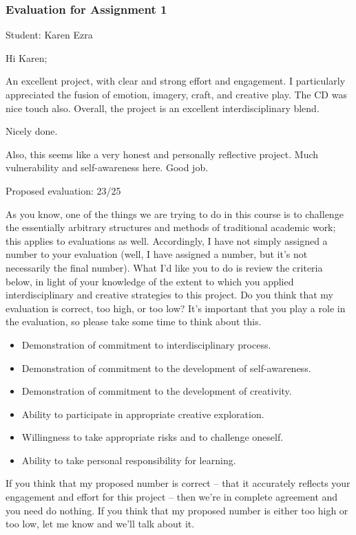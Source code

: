 \documentclass[letterpaper,10pt,DIV=9,headsepline]{scrreprt}
\begin{document}
\newpage

\subsubsection{Evaluation for Assignment 1}

Student: Karen Ezra

\bigskip
Hi Karen;

An excellent project, with clear and strong effort and engagement. I
particularly appreciated the fusion of emotion, imagery, craft, and
creative play. The CD was nice touch also. Overall, the project is an excellent interdisciplinary blend.

Nicely done.

Also, this seems like a very honest and personally reflective project.
Much vulnerability and self-awareness here. Good job.


\bigskip
Proposed evaluation: 23/25

\bigskip
As you know, one of the things we are trying to do in this course is
to challenge the essentially arbitrary structures and methods of
traditional academic work; this applies to evaluations as well.
Accordingly, I have not simply assigned a number to your evaluation
(well, I have assigned a number, but it's not necessarily the final
number). What I'd like you to do is review the criteria below, in
light of your knowledge of the extent to which you applied
interdisciplinary and creative strategies to this project. Do you
think that my evaluation is correct, too high, or too low? It's
important that you play a role in the evaluation, so please take some
time to think about this.

\begin{itemize}
\item Demonstration of commitment to interdisciplinary process.
\item Demonstration of commitment to the development of self-awareness.
\item Demonstration of commitment to the development of creativity.
\item Ability to participate in appropriate creative exploration.
\item Willingness to take appropriate risks and to challenge oneself.
\item Ability to take personal responsibility for learning.
\end{itemize}

If you think that my proposed number is correct -- that it accurately
reflects your engagement and effort for this project -- then we're in
complete agreement and you need do nothing. If you think that my
proposed number is either too high or too low, let me know and we'll
talk about it.
\end{document}
